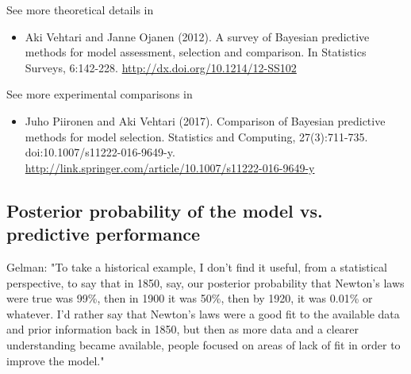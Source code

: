 \documentclass[a4paper,11pt,english]{article}
\begin{document}
See more theoretical details in
\begin{itemize}
\item Aki Vehtari and Janne Ojanen (2012). A survey of Bayesian
  predictive methods for model assessment, selection and
  comparison. In Statistics Surveys,
  6:142-228. \url{http://dx.doi.org/10.1214/12-SS102}
\end{itemize}

\noindent
See more experimental comparisons in 
\begin{itemize}
\item   Juho Piironen and Aki Vehtari (2017). Comparison of Bayesian predictive methods for model selection. Statistics and Computing, 27(3):711-735. doi:10.1007/s11222-016-9649-y. \url{http://link.springer.com/article/10.1007/s11222-016-9649-y}
\end{itemize}

\subsection*{Posterior probability of the model vs. predictive performance}

Gelman: "To take a historical example, I don't find it useful, from a
statistical perspective, to say that in 1850, say, our posterior
probability that Newton's laws were true was 99\%, then in 1900 it was
50\%, then by 1920, it was 0.01\% or whatever. I'd rather say that
Newton's laws were a good fit to the available data and prior
information back in 1850, but then as more data and a clearer
understanding became available, people focused on areas of lack of fit
in order to improve the model."
\end{document}

